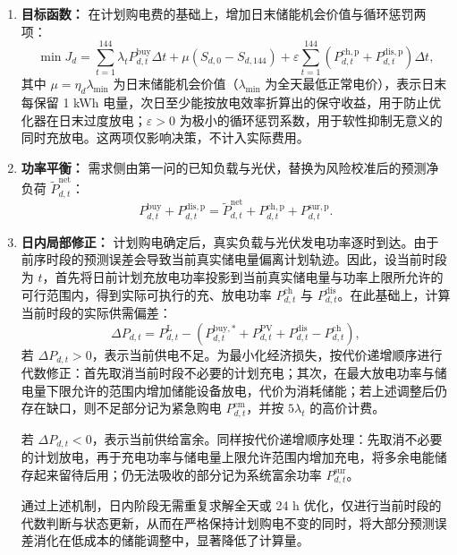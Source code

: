 \documentclass[withoutpreface,bwprint]{cumcmthesis}
\renewcommand{\bfseries}{\CJKfamily{bfsong}}
\begin{document}
\begin{enumerate}[label=(\bfseries\arabic*),leftmargin=40pt]

	\item \textbf{目标函数：}
	在计划购电费的基础上，增加日末储能机会价值与循环惩罚两项：
	\begin{equation}
		\min J_d=\sum_{t=1}^{144}\lambda_t P^{\mathrm{buy}}_{d,t}\Delta t
		+\mu\left(S_{d,0}-S_{d,144}\right)
		+\varepsilon\sum_{t=1}^{144}\left(P^{\mathrm{ch,p}}_{d,t}+P^{\mathrm{dis,p}}_{d,t}\right)\Delta t,
		\label{eq:q2dayobj}
	\end{equation}
	其中 $\mu=\eta_d\lambda_{\min}$ 为日末储能机会价值（$\lambda_{\min}$ 为全天最低正常电价），表示日末每保留 1 kWh 电量，次日至少能按放电效率折算出的保守收益，用于防止优化器在日末过度放电；$\varepsilon>0$ 为极小的循环惩罚系数，用于软性抑制无意义的同时充放电。这两项仅影响决策，不计入实际费用。
	
	\item \textbf{功率平衡：}
	需求侧由第一问的已知负载与光伏，替换为风险校准后的预测净负荷 $\tilde P^{\mathrm{net}}_{d,t}$：
	\begin{equation}
		P^{\mathrm{buy}}_{d,t}+P^{\mathrm{dis,p}}_{d,t}=\tilde P^{\mathrm{net}}_{d,t}+P^{\mathrm{ch,p}}_{d,t}+P^{\mathrm{sur,p}}_{d,t}.
		\label{eq:q2daybal}
	\end{equation}
	
	\item \textbf{日内局部修正：}
	计划购电确定后，真实负载与光伏发电功率逐时到达。由于前序时段的预测误差会导致当前真实储电量偏离计划轨迹。因此，设当前时段为 $t$，首先将日前计划充放电功率投影到当前真实储电量与功率上限所允许的可行范围内，得到实际可执行的充、放电功率 $P^{\mathrm{ch}}_{d,t}$ 与 $P^{\mathrm{dis}}_{d,t}$。在此基础上，计算当前时段的实际供需偏差：
	\begin{equation}
		\Delta P_{d,t}=P^{\mathrm{L}}_{d,t}-\left(P^{\mathrm{buy},*}_{d,t}+P^{\mathrm{PV}}_{d,t}+P^{\mathrm{dis}}_{d,t}-P^{\mathrm{ch}}_{d,t}\right),
		\label{eq:q2delta}
	\end{equation}
	若 $\Delta P_{d,t}>0$，表示当前供电不足。为最小化经济损失，按代价递增顺序进行代数修正：首先取消当前时段不必要的计划充电；其次，在最大放电功率与储电量下限允许的范围内增加储能设备放电，代价为消耗储能；若上述调整后仍存在缺口，则不足部分记为紧急购电 $P^{\mathrm{em}}_{d,t}$，并按 $5\lambda_t$ 的高价计费。
	
	若 $\Delta P_{d,t}<0$，表示当前供给富余。同样按代价递增顺序处理：先取消不必要的计划放电，再于充电功率与储电量上限允许范围内增加充电，将多余电能储存起来留待后用；仍无法吸收的部分记为系统富余功率 $P^{\mathrm{sur}}_{d,t}$。
	
	通过上述机制，日内阶段无需重复求解全天或 24 h 优化，仅进行当前时段的代数判断与状态更新，从而在严格保持计划购电不变的同时，将大部分预测误差消化在低成本的储能调整中，显著降低了计算量。
\end{enumerate}
\end{document}
